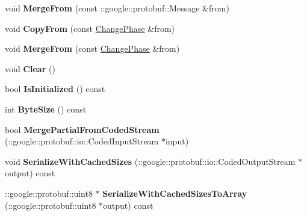 \begin{DoxyCompactItemize}
\item 
\hypertarget{class_change_phase_a0b4ea2d69bef41bfd5def289ed42f48b}{void {\bfseries Merge\-From} (const \-::google\-::protobuf\-::\-Message \&from)}\label{class_change_phase_a0b4ea2d69bef41bfd5def289ed42f48b}

\item 
\hypertarget{class_change_phase_acc54fcc2735378a34fe9f313b0d28d90}{void {\bfseries Copy\-From} (const \hyperlink{class_change_phase}{Change\-Phase} \&from)}\label{class_change_phase_acc54fcc2735378a34fe9f313b0d28d90}

\item 
\hypertarget{class_change_phase_a980a96f372dbf4eeff624c0ae7cb8537}{void {\bfseries Merge\-From} (const \hyperlink{class_change_phase}{Change\-Phase} \&from)}\label{class_change_phase_a980a96f372dbf4eeff624c0ae7cb8537}

\item 
\hypertarget{class_change_phase_ae5f1923ed41767cee32ef3475ad75ce0}{void {\bfseries Clear} ()}\label{class_change_phase_ae5f1923ed41767cee32ef3475ad75ce0}

\item 
\hypertarget{class_change_phase_a2fa641d0ce528ee22615eae08c8193cc}{bool {\bfseries Is\-Initialized} () const }\label{class_change_phase_a2fa641d0ce528ee22615eae08c8193cc}

\item 
\hypertarget{class_change_phase_adb5d0c836b47a428c7b8a8b11cc889e0}{int {\bfseries Byte\-Size} () const }\label{class_change_phase_adb5d0c836b47a428c7b8a8b11cc889e0}

\item 
\hypertarget{class_change_phase_a5cf5896de3c53cf0430b6747539fbb48}{bool {\bfseries Merge\-Partial\-From\-Coded\-Stream} (\-::google\-::protobuf\-::io\-::\-Coded\-Input\-Stream $\ast$input)}\label{class_change_phase_a5cf5896de3c53cf0430b6747539fbb48}

\item 
\hypertarget{class_change_phase_aa35438674277382e3a4e5c23d477cde6}{void {\bfseries Serialize\-With\-Cached\-Sizes} (\-::google\-::protobuf\-::io\-::\-Coded\-Output\-Stream $\ast$output) const }\label{class_change_phase_aa35438674277382e3a4e5c23d477cde6}

\item 
\hypertarget{class_change_phase_aa7987128eb875e6387cddb886094b922}{\-::google\-::protobuf\-::uint8 $\ast$ {\bfseries Serialize\-With\-Cached\-Sizes\-To\-Array} (\-::google\-::protobuf\-::uint8 $\ast$output) const }\label{class_change_phase_aa7987128eb875e6387cddb886094b922}


\end{DoxyCompactItemize}
